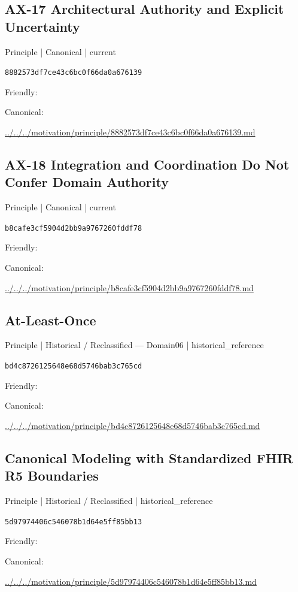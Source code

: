 \documentclass[10pt,a4paper]{article}
\begin{document}
\subsection*{AX-17 Architectural Authority and Explicit Uncertainty}
{\small Principle | Canonical | current}\par
\texttt{8882573df7ce43c6bc0f66da0a676139}\par
Friendly: \par
Canonical: \par
{\footnotesize\url{../../../motivation/principle/8882573df7ce43c6bc0f66da0a676139.md}}\par
\subsection*{AX-18 Integration and Coordination Do Not Confer Domain Authority}
{\small Principle | Canonical | current}\par
\texttt{b8cafe3cf5904d2bb9a9767260fddf78}\par
Friendly: \par
Canonical: \par
{\footnotesize\url{../../../motivation/principle/b8cafe3cf5904d2bb9a9767260fddf78.md}}\par
\subsection*{At-Least-Once}
{\small Principle | Historical / Reclassified — Domain06 | historical\_reference}\par
\texttt{bd4c8726125648e68d5746bab3c765cd}\par
Friendly: \par
Canonical: \par
{\footnotesize\url{../../../motivation/principle/bd4c8726125648e68d5746bab3c765cd.md}}\par
\subsection*{Canonical Modeling with Standardized FHIR R5 Boundaries}
{\small Principle | Historical / Reclassified | historical\_reference}\par
\texttt{5d97974406c546078b1d64e5ff85bb13}\par
Friendly: \par
Canonical: \par
{\footnotesize\url{../../../motivation/principle/5d97974406c546078b1d64e5ff85bb13.md}}\par
\end{document}
